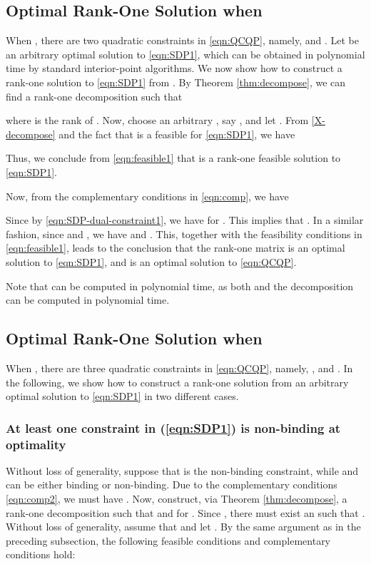 \documentclass[twocolumn,10pt]{IEEEtran}
\theoremstyle{plain} \newtheorem{theorem}{Theorem}
\theoremstyle{plain} \newtheorem{proposition}{Proposition}
\theoremstyle{plain} \newtheorem{corollary}{Corollary}
\theoremstyle{remark} \newtheorem{remark}{Remark}
\theoremstyle{remark} \newtheorem{lemma}{Lemma}
\theoremstyle{plain} \newtheorem{definition}{Definition}
\theoremstyle{plain} \newtheorem{assumption}{Assumption}
\theoremstyle{plain} \newtheorem{fact}{Fact}
\begin{document}
\subsection{Optimal Rank-One Solution when }\label{subsection:4-1}
When , there are two quadratic constraints in \eqref{eqn:QCQP}, namely,  and . Let  be an arbitrary optimal solution to \eqref{eqn:SDP1}, which can be obtained in polynomial time by standard interior-point algorithms. We now show how to construct a rank-one solution to \eqref{eqn:SDP1} from .  By Theorem \ref{thm:decompose}, we can find a rank-one decomposition  such that

where  is the rank of . Now, choose an arbitrary , say , and let . From \eqref{X-decompose} and the fact that  is a feasible for \eqref{eqn:SDP1}, we have

Thus, we conclude from \eqref{eqn:feasible1} that  is a rank-one feasible solution to \eqref{eqn:SDP1}.

Now, from the complementary conditions in \eqref{eqn:comp}, we have

Since  by \eqref{eqn:SDP-dual-constraint1}, we have  for .  This implies that .  In a similar fashion, since  and , we have  and .  This, together with the feasibility conditions in \eqref{eqn:feasible1}, leads to the conclusion that the rank-one matrix  is an optimal solution to \eqref{eqn:SDP1}, and  is an optimal solution to \eqref{eqn:QCQP}.

Note that  can be computed in polynomial time, as both  and the decomposition  can be computed in polynomial time.

\subsection{Optimal Rank-One Solution when }\label{subsection:4-2}
When , there are three quadratic constraints in \eqref{eqn:QCQP}, namely, ,  and . In the following, we show how to construct a rank-one solution from an arbitrary optimal solution  to \eqref{eqn:SDP1} in two different cases.

\subsubsection{\textbf{At least one constraint in (\ref{eqn:SDP1}) is non-binding at optimality}}
Without loss of generality, suppose that  is the non-binding constraint, while  and  can be either binding or non-binding. Due to the complementary conditions \eqref{eqn:comp2}, we must have .  Now, construct, via Theorem \ref{thm:decompose}, a rank-one decomposition  such that  and  for . Since , there must exist an  such that . Without loss of generality, assume that  and let . By the same argument as in the preceding subsection, the following feasible conditions and complementary conditions hold:
\end{document}
